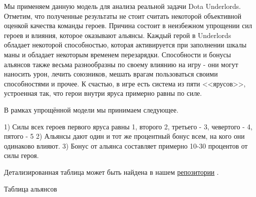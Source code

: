 \documentclass{article}
\begin{document}
Мы применяем данную модель для анализа реальной задачи Dota Underlords. Отметим, что полученные результаты не стоит считать некоторой объективной оценкой качества команды героев. Причина состоит в неизбежном упрощении сил героев и влияния, которое оказывают альянсы. Каждый герой в Underlords обладает некоторой способностью, которая активируется при заполнении шкалы маны и обладает некоторым временем перезарядки. Способности и бонусы альянсов также весьма разнообразны по своему влиянию на игру - они могут наносить урон, лечить союзников, мешать врагам пользоваться своими способностями и прочее. К счастью, в игре есть система из пяти <<ярусов>>, устроенная так, что герои внутри яруса примерно равны по силе.

В рамках упрощённой модели мы принимаем следующее.

1) Силы всех героев первого яруса равны 1, второго 2, третьего - 3, чевертого - 4, пятого - 5
2) Альянсы дают один и тот же процентный бонус всем, на кого они одинаково влияют.
3) Бонус от альянса составляет примерно 10-30 процентов от силы героя.

Детализированная таблица может быть найдена в нашем \href{https://github.com/aponom84/UnderLords/blob/master/UnderLordsData.xlsx}{репозитории} \cite{UnderLoardsInput}.

Таблица альянсов \\
\end{document}
